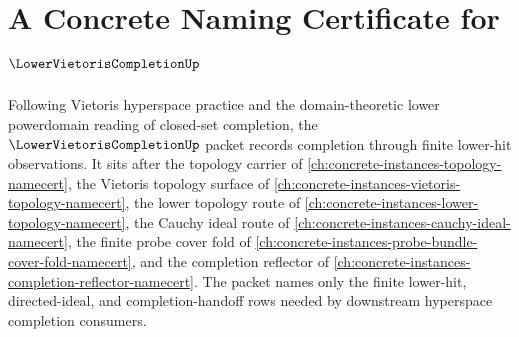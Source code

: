 \chapter{A Concrete Naming Certificate for $\LowerVietorisCompletionUp$}
\label{ch:concrete-instances-lower-vietoris-completion-namecert}

Following Vietoris hyperspace practice and the domain-theoretic lower powerdomain reading of closed-set completion, the $\LowerVietorisCompletionUp$ packet records completion through finite lower-hit observations. It sits after the topology carrier of \autoref{ch:concrete-instances-topology-namecert}, the Vietoris topology surface of \autoref{ch:concrete-instances-vietoris-topology-namecert}, the lower topology route of \autoref{ch:concrete-instances-lower-topology-namecert}, the Cauchy ideal route of \autoref{ch:concrete-instances-cauchy-ideal-namecert}, the finite probe cover fold of \autoref{ch:concrete-instances-probe-bundle-cover-fold-namecert}, and the completion reflector of \autoref{ch:concrete-instances-completion-reflector-namecert}. The packet names only the finite lower-hit, directed-ideal, and completion-handoff rows needed by downstream hyperspace completion consumers.

